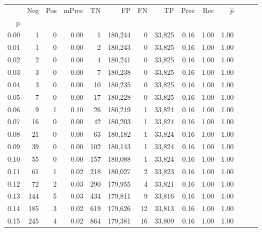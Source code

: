 \begin{tabular}{rrrrrrrrrrrrrr}
\toprule
{} &    Neg &  Pos & mPrec &       TN &       FP &      FN &      TP &  Prec &   Rec & $\hat{p}$ \\
p    &        &      &       &          &          &         &         &       &       &           \\
\midrule
0.00 &      1 &    0 &  0.00 &        1 &  180,244 &       0 &  33,825 &  0.16 &  1.00 &      1.00 \\
0.01 &      1 &    0 &  0.00 &        2 &  180,243 &       0 &  33,825 &  0.16 &  1.00 &      1.00 \\
0.02 &      2 &    0 &  0.00 &        4 &  180,241 &       0 &  33,825 &  0.16 &  1.00 &      1.00 \\
0.03 &      3 &    0 &  0.00 &        7 &  180,238 &       0 &  33,825 &  0.16 &  1.00 &      1.00 \\
0.04 &      3 &    0 &  0.00 &       10 &  180,235 &       0 &  33,825 &  0.16 &  1.00 &      1.00 \\
0.05 &      7 &    0 &  0.00 &       17 &  180,228 &       0 &  33,825 &  0.16 &  1.00 &      1.00 \\
0.06 &      9 &    1 &  0.10 &       26 &  180,219 &       1 &  33,824 &  0.16 &  1.00 &      1.00 \\
0.07 &     16 &    0 &  0.00 &       42 &  180,203 &       1 &  33,824 &  0.16 &  1.00 &      1.00 \\
0.08 &     21 &    0 &  0.00 &       63 &  180,182 &       1 &  33,824 &  0.16 &  1.00 &      1.00 \\
0.09 &     39 &    0 &  0.00 &      102 &  180,143 &       1 &  33,824 &  0.16 &  1.00 &      1.00 \\
0.10 &     55 &    0 &  0.00 &      157 &  180,088 &       1 &  33,824 &  0.16 &  1.00 &      1.00 \\
0.11 &     61 &    1 &  0.02 &      218 &  180,027 &       2 &  33,823 &  0.16 &  1.00 &      1.00 \\
0.12 &     72 &    2 &  0.03 &      290 &  179,955 &       4 &  33,821 &  0.16 &  1.00 &      1.00 \\
0.13 &    144 &    5 &  0.03 &      434 &  179,811 &       9 &  33,816 &  0.16 &  1.00 &      1.00 \\
0.14 &    185 &    3 &  0.02 &      619 &  179,626 &      12 &  33,813 &  0.16 &  1.00 &      1.00 \\
0.15 &    245 &    4 &  0.02 &      864 &  179,381 &      16 &  33,809 &  0.16 &  1.00 &      1.00 \\

\end{tabular}
